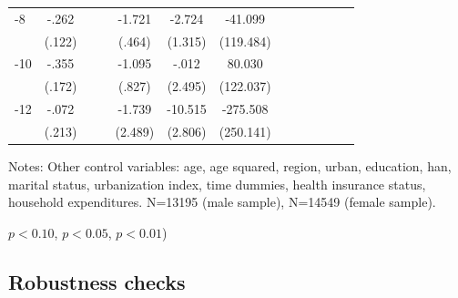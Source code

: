 \begin{table}[hp]
\begin{adjustbox}{max width=\linewidth}
\begin{threeparttable}
{\begin{tabular}{l*{6}{S
S}}
-8             &    -.262\sym{**} &         &         &   -1.721\sym{***}&   -2.724\sym{**} &  -41.099         \\
                &   (.122)         &         &         &   (.464)         &  (1.315)         &(119.484)         \\
-10            &    -.355\sym{**} &         &         &   -1.095         &    -.012         &   80.030         \\
                &   (.172)         &         &         &   (.827)         &  (2.495)         &(122.037)         \\
-12           &    -.072         &         &         &   -1.739         &  -10.515\sym{***}& -275.508         \\
                &   (.213)         &         &         &  (2.489)         &  (2.806)         &(250.141)         \\
\bottomrule
\end{tabular}
\begin{tablenotes}
\item Notes: Other control variables: age, age squared, region, urban, education, han, marital status, urbanization index, time dummies, health insurance status, household expenditures. N=13195 (male sample), N=14549 (female sample).
\item \sym{*} \(p<0.10\), \sym{**} \(p<0.05\), \sym{***} \(p<0.01\))
\end{tablenotes}
}
\end{threeparttable}
\end{adjustbox}
\end{table}
\FloatBarrier

\subsection*{Robustness checks}

